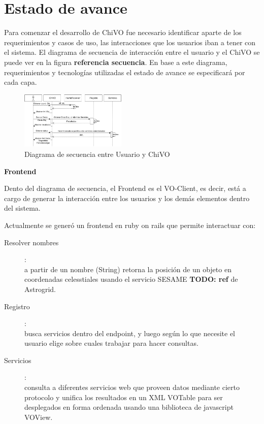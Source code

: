 \section{Estado de avance}

Para comenzar el desarrollo de ChiVO fue necesario identificar aparte de los 
requerimientos y casos de uso, las interacciones que los usuarios iban a tener 
con el sistema. El diagrama de secuencia de interacción entre el usuario y el 
ChiVO se puede ver en la figura \textbf{referencia secuencia}. 
En base a este diagrama, requerimientos y tecnologías utilizadas el estado de 
avance se especificará por cada capa.

\begin{figure}[h]
    \centering
    \includegraphics[width=0.45\textwidth]{images/secuencia.png}
    \caption{Diagrama de secuencia entre Usuario y ChiVO}
    \label{fig:secuencia}
\end{figure}

\textbf{Frontend}

Dento del diagrama de secuencia, el Frontend es el VO-Client, es decir, está a cargo de generar la interacción entre los usuarios y los demás elementos dentro del sistema.

Actualmente se generó un frontend en ruby on rails que permite interactuar con: 
\begin{description}
 \item[Resolver nombres]:\hfill \\
  a partir de un nombre (String) retorna la posición de un objeto en coordenadas celesstiales usando el servicio SESAME \textbf{TODO: ref} de Astrogrid.
 \item[Registro]: \hfill \\
 busca servicios dentro del endpoint, y luego según lo que necesite el usuario elige sobre cuales trabajar para hacer consultas. 
 \item[Servicios]: \hfill \\
 consulta a diferentes servicios web que proveen datos mediante cierto protocolo y unifica los resultados en un XML VOTable para ser desplegados en forma ordenada usando una biblioteca de javascript VOView.
\end{description}

